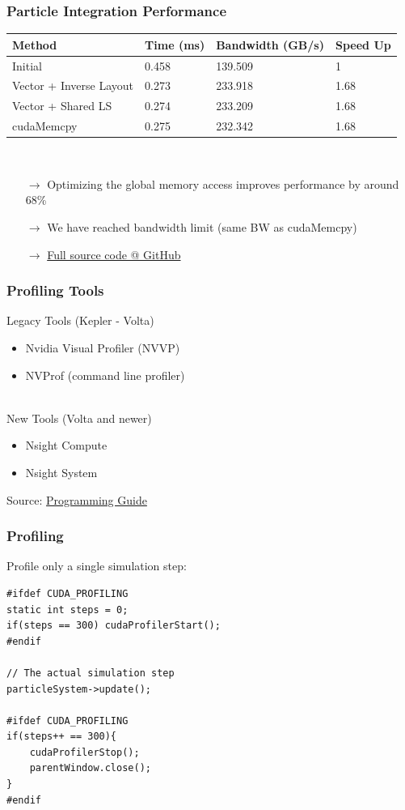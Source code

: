 \documentclass[aspectratio=169,handout]{beamer}
\begin{document}
\begin{frame}[fragile]
\frametitle{Particle Integration Performance}
	\begin{tabular}{l|l|l|l}
	\textbf{Method} & \textbf{Time (ms)} & \textbf{Bandwidth (GB/s)} & \textbf{Speed Up} \\	
	\hline
	Initial & 0.458  & 139.509 & 1 \\
	Vector + Inverse Layout & 0.273  &       233.918 & 1.68 \\
	Vector + Shared LS & 0.274   &    233.209 & 1.68 \\
	cudaMemcpy & 0.275   &    232.342 & 1.68  
\end{tabular}
\\
\vspace{0.5cm}
\begin{itemize}
	\item[$\rightarrow$] Optimizing the global memory access improves performance by around 68\%
	\item[$\rightarrow$] We have reached bandwidth limit (same BW as cudaMemcpy)
	\item[$\rightarrow$] \href{https://github.com/darglein/saiga/blob/master/samples/cuda/globalMemory/main.cu}{Full source code @ GitHub}
\end{itemize}
\end{frame}


\begin{frame}[fragile]
\frametitle{Profiling Tools}
Legacy Tools (Kepler - Volta)
\begin{itemize}
	\item Nvidia Visual Profiler (NVVP)
	\item NVProf (command line profiler)
\end{itemize}
\hrulefill \\
New Tools (Volta and newer)
\begin{itemize}
	\item Nsight Compute
	\item Nsight System
\end{itemize}
\vspace{0.5cm}
Source: \href{https://docs.nvidia.com/cuda/profiler-users-guide/index.html#migrating-to-nsight-tools}{Programming Guide}
\end{frame}


\begin{frame}[fragile]
\frametitle{Profiling}
Profile only a single simulation step:

\begin{lstlisting}
#ifdef CUDA_PROFILING
static int steps = 0;
if(steps == 300) cudaProfilerStart();
#endif

// The actual simulation step
particleSystem->update();

#ifdef CUDA_PROFILING
if(steps++ == 300){
	cudaProfilerStop();
	parentWindow.close();
}
#endif

\end{lstlisting}
\end{frame}
\end{document}
